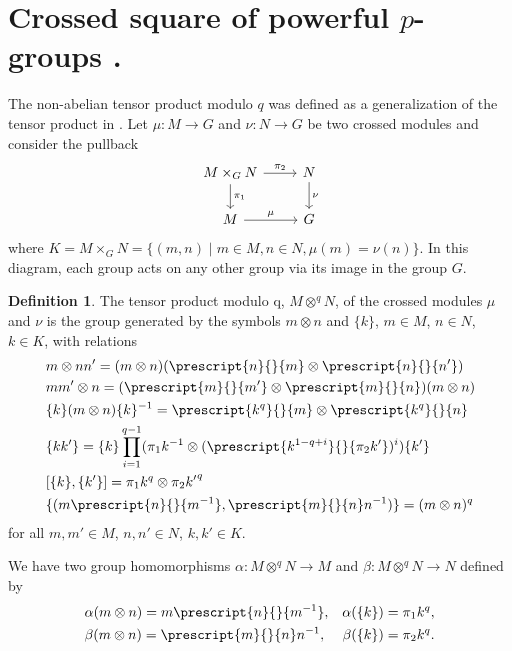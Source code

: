 \documentclass[12pt]{elsarticle}
\newtheorem*{main corollary*}{Main Corollary}
\theoremstyle{definition}
\newtheorem{definition}[theorem]{Definition}
\newcommand{\tens}{
	\otimes^q}
\begin{document}
\section{Crossed square of powerful $p$-groups .} \label{section: crossed square II}
The non-abelian tensor product modulo $q$ was defined as a generalization of the tensor product in \cite[Definition 1.1]{CR92}. Let $\mu:M \to G$ and $\nu: N \to G$ be two crossed modules and consider the pullback
	\begin{equation}\label{Pull back diagram}
	  \begin{tikzcd}
			M \times_G N \arrow[r,"\pi_2"] \arrow[d,"\pi_1"] & N \arrow[d,"\nu"] \\
			M \arrow[r,"\mu"] & G
		\end{tikzcd}
	\end{equation}
	where $K=M \times_G N=\{(m,n) \mid m \in M,n\in N,\mu(m)=\nu(n)\}$. In this diagram, each group acts on any other group via its image in the group $G$. 
	\begin{definition}\label{Defn q tensor}
		The tensor product modulo q, $M \tens N$, of the crossed modules $\mu$ and $\nu$ is the group generated by the symbols $m \otimes n$ and $\{k\}$, $m \in M$, $n \in N$, $k \in K$, with relations
		\begin{align}
			& m \otimes nn'=(m \otimes n)(\prescript{n}{}{m} \otimes \prescript{n}{}{n'})\label{E:q-tensor def 1} \\
			& mm' \otimes n = (\prescript{m}{}{m'} \otimes \prescript{m}{}{n})(m \otimes n)\\
			& \{k\}(m \otimes n)\{k\}^{-1}= \prescript{k^q}{}{m} \otimes \prescript{k^q}{}{n} \label{E:q-tensor def 3}\\
			&\{kk'\}=\{k\} \prod \limits_{i=1}^{q-1}(\pi_1k^{-1} \otimes ( \prescript{k^{1-q+i}}{}{\pi_2k'})^i)\{k'\}  \\
			& [\{k\},\{k'\}]=\pi_1 k^q \otimes \pi_2 {k'}^q \label{E:q-tensor def 5} \\
			& \{(m\prescript{n}{}{m^{-1}},\prescript{m}{}{n}n^{-1})\}=(m \otimes n)^q\label{E:q-tensor def 6} 
		\end{align}
   for all $m,m' \in M$, $n,n' \in N$, $k, k' \in K$.
	\end{definition}
We have two group homomorphisms $\alpha:M \tens N \to M$ and $\beta: M \tens N \to N$ defined by 
\begin{align}
	& \alpha(m \otimes n)=m\prescript{n}{}{m^{-1}}, & \alpha(\{k\})=\pi_1 k^q,\label{E:alpha}\\
	& \beta(m \otimes n)=\prescript{m}{}{n}n^{-1}, & \beta(\{k\})=\pi_2 k^q.\label{E:beta}
\end{align}
\end{document}
